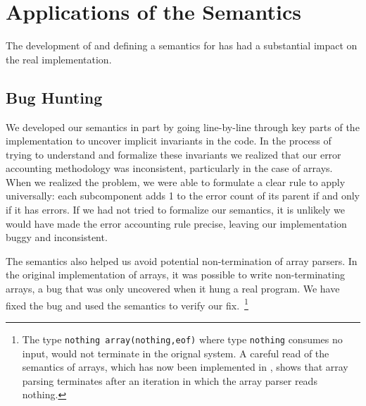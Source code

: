 \section{Applications of the Semantics}
\label{sec:applications}

The development of \ddc{} and defining a semantics for \ipads{}
has had a substantial impact on the real \pads{} implementation.



\subsection{Bug Hunting}

We developed our semantics in part by going line-by-line through
key parts of the \pads{} implementation to uncover implicit invariants in the
code.  In the process of trying to understand and formalize these
invariants we realized that our error accounting methodology was
inconsistent, particularly in the case of arrays.   When we realized
the problem, we were able to formulate a clear rule to apply universally:
each subcomponent adds 1 to the error count of its
parent if and only if it has errors.  If we had not tried to 
formalize our semantics, it is unlikely we would have made the
error accounting rule precise, leaving our implementation buggy 
and inconsistent.

The semantics also helped us avoid potential non-termination of array
parsers. In the original implementation of \pads{} arrays, it was
possible to write non-terminating arrays, a bug that was only
uncovered when it hung a real program.  We have fixed the bug and used
the semantics to verify our fix.~\footnote{The type {\tt nothing
    array(nothing,eof)} where type {\tt nothing} consumes no input,
  would not terminate in the orignal system.  A careful read of the
  \ddc{} semantics of arrays, which has now been implemented in
  \pads{}, shows that array parsing terminates after an iteration in
  which the array parser reads nothing.}



